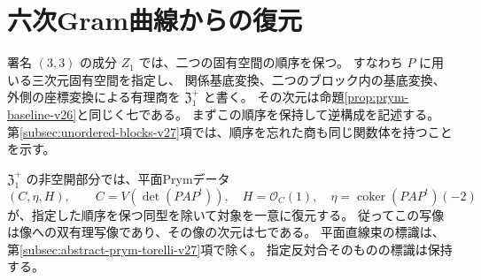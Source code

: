 \section{六次Gram曲線からの復元}
\label{sec:prym-torelli-sextic-v26}

署名 $(3,3)$ の成分 $Z_1$ では、二つの固有空間の順序を保つ。
すなわち $P$ に用いる三次元固有空間を指定し、
関係基底変換、二つのブロック内の基底変換、外側の座標変換による有理商を
$\mathfrak Z_1^+$ と書く。
その次元は命題\ref{prop:prym-baseline-v26}と同じく七である。
まずこの順序を保持して逆構成を記述する。
第\ref{subsec:unordered-blocks-v27}項では、順序を忘れた商も同じ関数体を持つことを示す。

\begin{theorem}[平面Prymデータによる復元]
\label{thm:plane-prym-torelli-v26}
$\mathfrak Z_1^+$ の非空開部分では、平面Prymデータ
\[
 (C,\eta,H),\qquad
 C=V(\det(PAP^t)),\quad H=\mathcal O_C(1),\quad
 \eta=\operatorname{coker}(PAP^t)(-2)
\]
が、指定した順序を保つ同型を除いて対象を一意に復元する。
従ってこの写像は像への双有理写像であり、その像の次元は七である。
平面直線束の標識は、第\ref{subsec:abstract-prym-torelli-v27}項で除く。
指定反対合そのものの標識は保持する。
\end{theorem}

